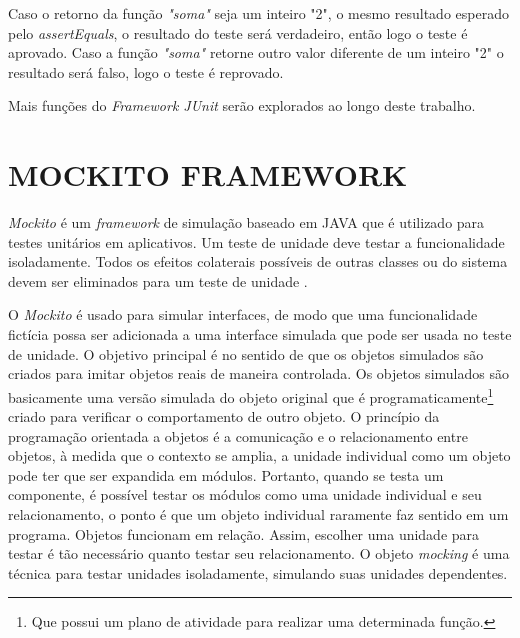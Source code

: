 Caso o retorno da função \textit{"soma"} seja um inteiro "2", o mesmo resultado esperado pelo \textit{assertEquals}, o resultado do teste será verdadeiro, então logo o teste é aprovado. Caso a função \textit{"soma"} retorne outro valor diferente de um inteiro "2"  o resultado será falso, logo o teste é reprovado. 


    Mais funções do \textit{Framework JUnit} serão explorados ao longo deste trabalho.


\section{MOCKITO FRAMEWORK}


\textit{Mockito} é um \textit{framework} de simulação baseado em JAVA que é utilizado para testes unitários em aplicativos. Um teste de unidade deve testar a funcionalidade isoladamente. Todos os efeitos colaterais possíveis de outras classes ou do sistema devem ser eliminados para um teste de unidade  \cite{Mockito}. 


O \textit{Mockito} é usado para simular interfaces, de modo que uma funcionalidade fictícia possa ser adicionada a uma interface simulada que pode ser usada no teste de unidade. O objetivo principal é no sentido de que os objetos simulados são criados para imitar objetos reais de maneira controlada. Os objetos simulados são basicamente uma versão simulada do objeto original que é programaticamente\footnote{Que possui um plano de atividade para realizar uma determinada função.} criado para verificar o comportamento de outro objeto. O princípio da programação orientada a objetos é a comunicação e o relacionamento entre objetos, à medida que o contexto se amplia, a unidade individual como um objeto pode ter que ser expandida em módulos. Portanto, quando se testa um componente, é possível testar os módulos como uma unidade individual e seu relacionamento, o ponto é que um objeto individual raramente faz sentido em um programa. Objetos funcionam em relação. Assim, escolher uma unidade para testar é tão necessário quanto testar seu relacionamento. O objeto \textit{mocking} é uma técnica para testar unidades isoladamente, simulando suas unidades dependentes.




